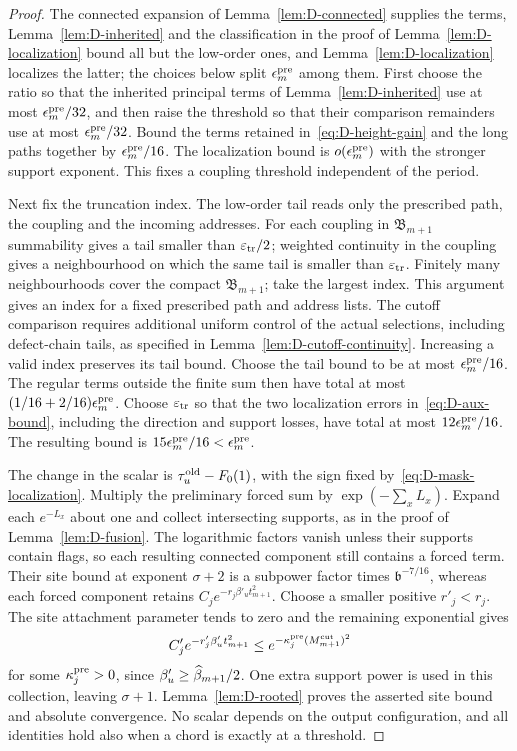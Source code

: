 \begin{proof}
The connected expansion of Lemma~\ref{lem:D-connected} supplies the terms, Lemma~\ref{lem:D-inherited} and the classification in the proof of Lemma~\ref{lem:D-localization} bound all but the low-order ones, and Lemma~\ref{lem:D-localization} localizes the latter; the choices below split $\epsilon^{\rm pre}_m$ among them. First choose the ratio so that the inherited principal terms of Lemma~\ref{lem:D-inherited} use at most $\epsilon^{\rm pre}_m/32$, and then raise the threshold so that their comparison remainders use at most $\epsilon^{\rm pre}_m/32$. Bound the terms retained in~\eqref{eq:D-height-gain} and the long paths together by $\epsilon^{\rm pre}_m/16$. The localization bound is $o(\epsilon^{\rm pre}_m)$ with the stronger support exponent. This fixes a coupling threshold independent of the period.

Next fix the truncation index. The low-order tail reads only the prescribed path, the coupling and the incoming addresses. For each coupling in $\mathfrak B_{m+1}$ summability gives a tail smaller than $\varepsilon_{\rm tr}/2$; weighted continuity in the coupling gives a neighbourhood on which the same tail is smaller than $\varepsilon_{\rm tr}$. Finitely many neighbourhoods cover the compact $\mathfrak B_{m+1}$; take the largest index. This argument gives an index for a fixed prescribed path and address lists. The cutoff comparison requires additional uniform control of the actual selections, including defect-chain tails, as specified in Lemma~\ref{lem:D-cutoff-continuity}. Increasing a valid index preserves its tail bound. Choose the tail bound to be at most $\epsilon^{\rm pre}_m/16$. The regular terms outside the finite sum then have total at most $(1/16+2/16)\epsilon^{\rm pre}_m$. Choose $\varepsilon_{\rm tr}$ so that the two localization errors in~\eqref{eq:D-aux-bound}, including the direction and support losses, have total at most $12\epsilon^{\rm pre}_m/16$. The resulting bound is $15\epsilon^{\rm pre}_m/16<\epsilon^{\rm pre}_m$.

The change in the scalar is $\tau_u^{\rm old}-F_0(1)$, with the sign fixed by~\eqref{eq:D-mask-localization}. Multiply the preliminary forced sum by $\exp(-\sum_xL_x)$. Expand each $e^{-L_x}$ about one and collect intersecting supports, as in the proof of Lemma~\ref{lem:D-fusion}. The logarithmic factors vanish unless their supports contain flags, so each resulting connected component still contains a forced term. Their site bound at exponent $\sigma+2$ is a subpower factor times $\mathfrak b^{-7/16}$, whereas each forced component retains $C_j e^{-r_j\beta'_u t_{m+1}^2}$. Choose a smaller positive $r'_j<r_j$. The site attachment parameter tends to zero and the remaining exponential gives
\begin{equation*}
C'_j e^{-r'_j\beta'_u t_{m+1}^2}
\le e^{-\kappa_j^{\rm pre}(M^{\mathrm{cut}}_{m+1})^2}
\end{equation*}
for some $\kappa_j^{\rm pre}>0$, since $\beta'_u\ge\widehat{\beta}_{m+1}/2$. One extra support power is used in this collection, leaving $\sigma+1$. Lemma~\ref{lem:D-rooted} proves the asserted site bound and absolute convergence. No scalar depends on the output configuration, and all identities hold also when a chord is exactly at a threshold.


\end{proof}
